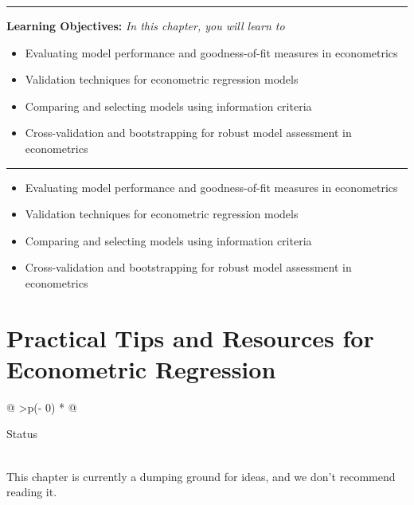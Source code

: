 \documentclass[
  letterpaper,
  paper =a4,
  twoside,
  openright,
  headsepline,
  footsepline,
  listof = totocnumbered,
  chapterprefix = true,
  firstiscover]{scrbook}
\providecommand{\abstractname}{Learning Objectives} %
\newenvironment{objectives}[1]{%
	\hrule
	\vspace{5pt}
	\small\textbf{\abstractname: } 
	\newline
	\vspace{0.1cm}
	\small\emph{#1} %
	\itshape %
}{%
	\vspace{5pt}
	\hrule
	\vspace{0.6cm}
}
\begin{document}
\begin{objectives}{In this chapter, you will learn to}
\begin{itemize}

\item{Evaluating model performance and goodness-of-fit measures in econometrics}

\item{Validation techniques for econometric regression models}

\item{Comparing and selecting models using information criteria}

\item{Cross-validation and bootstrapping for robust model assessment in econometrics}

\end{itemize}

\end{objectives}

\begin{itemize}
\item
  Evaluating model performance and goodness-of-fit measures in
  econometrics
\item
  Validation techniques for econometric regression models
\item
  Comparing and selecting models using information criteria
\item
  Cross-validation and bootstrapping for robust model assessment in
  econometrics
\end{itemize}


\hypertarget{practical-tips-and-resources-for-econometric-regression}{%
\chapter{Practical Tips and Resources for Econometric
Regression}\label{practical-tips-and-resources-for-econometric-regression}}

\begin{longtable}[]{@{}
  >{\centering\arraybackslash}p{(\columnwidth - 0\tabcolsep) * }@{}}
\toprule\noalign{}
\begin{minipage}[b]{\linewidth}\centering
Status
\end{minipage} \\
\midrule\noalign{}
\endhead
\bottomrule\noalign{}
\endlastfoot
This chapter is currently a dumping ground for ideas, and we don't
recommend reading it. \\
\end{longtable}
\end{document}
